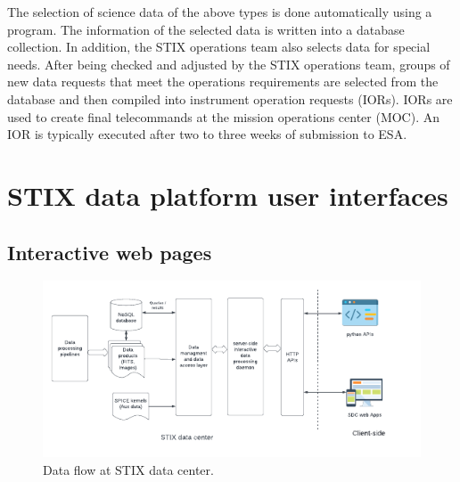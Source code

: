 \documentclass[referee]{preaa} %
\begin{document}
The selection of science data of the above types is done automatically using a program. The information of the selected data is written into a database collection.  In addition, the STIX operations team also selects data for special 
needs.  After being checked and adjusted by the STIX operations team, groups of new data requests that meet the operations requirements are selected from the database and then compiled into instrument operation requests (IORs). 
IORs are used to create final telecommands at the mission operations center (MOC). An IOR is typically executed after two to three weeks of submission to ESA. 

\section{STIX data platform user interfaces}
\subsection{Interactive web pages}
\begin{figure}[ht]
  \centering
  \includegraphics[width=0.9\linewidth]{figures/interfaces.pdf}
  \caption{ 
    Data flow at STIX data center.
  }
  \label{fig:interfaces}
\end{figure}
\end{document}
